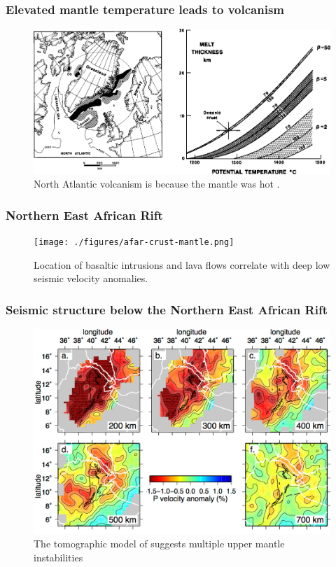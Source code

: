 \documentclass[aspectratio=169]{beamer}
\begin{document}
\begin{frame}
    \frametitle{Elevated mantle temperature leads to volcanism}
    \begin{figure}
        \includegraphics[height=0.6\paperheight]{./figures/mckenzie.png}
        \caption{North Atlantic volcanism is because the mantle was hot \citep{white-1995}.}
    \end{figure}
\end{frame}

\begin{frame}
    \frametitle{Northern East African Rift}
    \begin{figure}
        \texttt{[image: ./figures/afar-crust-mantle.png]}
        \caption{Location of basaltic intrusions and lava flows correlate with deep low seismic velocity anomalies.}
    \end{figure}
\end{frame}

\begin{frame}
    \frametitle{Seismic structure below the Northern East African Rift}
    \begin{figure}
        \vspace{-0.3cm}
        \includegraphics[height=0.7\paperheight]{./figures/civiero-2016.png}
        \caption{The tomographic model of \cite{civiero-etal-2016} suggests multiple upper mantle instabilities}
    \end{figure}
\end{frame}
\end{document}
